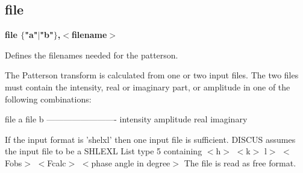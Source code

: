 \subsection*{file}
{\bf file $ \{$"a"$| $"b"$\} $,$ <$filename$> $ \par }
\par
\vspace{3pt}
Defines the filenames needed for the patterson. 
\par
The Patterson transform is calculated from one or two input files. 
The two files must contain the intensity, real or imaginary part, 
or amplitude in one of the following combinations: 
\par
\begin{MacVerbatim}
file a          file b
-------------------------
intensity
amplitude
real            imaginary
\end{MacVerbatim}
If the input format is 'shelxl' then one input file is sufficient. 
DISCUS assumes the input file to be a SHLEXL List type 5 containing 
$ <$h$> $ $ <$k$> $ l$> $ $ <$Fobs$> $ $ <$Fcalc$> $ $ <$phase angle in degree$> $ 
The file is read as free format. 

